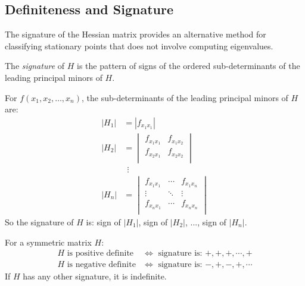 \documentclass[../main.tex]{subfiles}
\begin{document}
\subsection{Definiteness and Signature}
The signature of the Hessian matrix provides an alternative method for classifying stationary points that does not involve computing eigenvalues.

\begin{definition}[Signature]
  The \textit{signature} of $H$ is the pattern of signs of the ordered sub-determinants of the leading principal minors of $H$.
\end{definition}
For $f(x_1, x_2, \ldots, x_n)$, the sub-determinants of the leading principal minors of $H$ are:
\begin{align*}
  |H_1| &= |f_{x_1 x_1}| \\
  |H_2| &= \begin{vmatrix}
  f_{x_1 x_1} & f_{x_1 x_2} \\
  f_{x_2 x_1} & f_{x_2 x_2} \\
  \end{vmatrix} \\
  &\ \ \vdots \\
  |H_n| &= \begin{vmatrix}
  f_{x_1 x_1} & \cdots & f_{x_1 x_n} \\
  \vdots & \ddots & \vdots \\
  f_{x_n x_1} & \cdots & f_{x_nx_n } \\
  \end{vmatrix}
\end{align*}
So the signature of $H$ is: sign of $|H_1|$, sign of $|H_2|$, ..., sign of $|H_n|$.
\begin{theorem}
  For a symmetric matrix $H$: \label{syvestersCritereon}
  \begin{align*}
    H \text{ is positive definite} &\iff \text{ signature is: }+, +, +, \cdots, +\\
    H \text{ is negative definite} &\iff \text{ signature is: }-, +, -, +, \cdots
  \end{align*}
  If $H$ has any other signature, it is indefinite.
\end{theorem}
\end{document}
